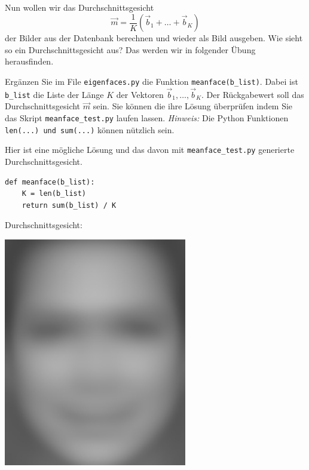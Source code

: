 Nun wollen wir das Durchschnittsgesicht
\begin{equation*}
	\vec m=\frac{1}{K}\left(\vec b_1+\ldots+\vec b_K\right)
\end{equation*}
der Bilder aus der Datenbank berechnen und wieder als Bild ausgeben.
Wie sieht so ein Durchschnittsgesicht aus?
Das werden wir in folgender Übung herausfinden.
\begin{aufgabe} \label{aufg:meanface}
	Ergänzen Sie im File \texttt{eigenfaces.py} die Funktion \texttt{meanface(b\_list)}.
	Dabei ist \texttt{b\_list} die Liste der Länge $K$ der Vektoren $\vec b_1,\ldots,\vec b_K$.
	Der Rückgabewert soll das Durchschnittsgesicht $\vec m$ sein.
	Sie können die ihre Lösung überprüfen indem Sie das Skript \texttt{meanface\_test.py} laufen lassen.
	\textit{Hinweis:} Die Python Funktionen \texttt{len(...) und sum(...)} können nützlich sein.
\end{aufgabe}
\begin{losung}
	Hier ist eine mögliche Lösung und das davon mit \texttt{meanface\_test.py} generierte Durchschnittsgesicht.\\[0.5cm]
	\begin{minipage}{0.45\textwidth}
\begin{lstlisting}[style=python]
def meanface(b_list):
	K = len(b_list)
	return sum(b_list) / K
\end{lstlisting}
	\end{minipage}\hfill
	\begin{minipage}{0.3\textwidth}\vspace{-1cm}
		\centering\hfill Durchschnittsgesicht:
	\end{minipage}
	\begin{minipage}{0.2\textwidth}\vspace{-1cm}
		\centering\includegraphics[width=0.6\textwidth]{images/facespace/meanface}
	\end{minipage}
\end{losung}

